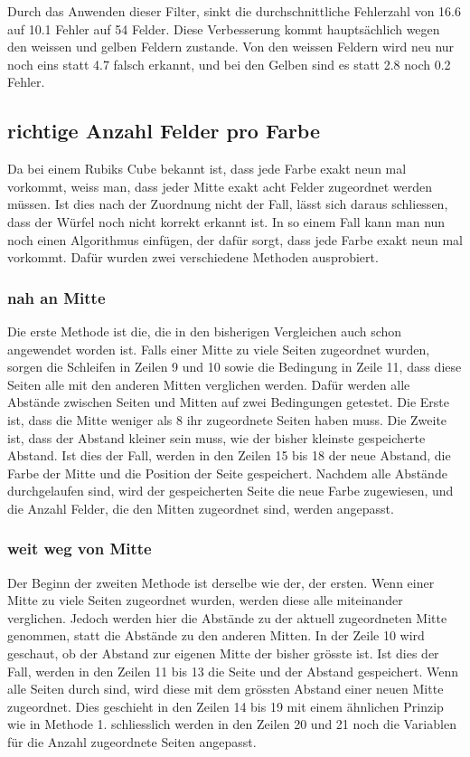 \documentclass[a4paper, 12pt]{article}
\begin{document}
Durch das Anwenden dieser Filter, sinkt die durchschnittliche Fehlerzahl von 16.6 auf 10.1 Fehler auf 54 Felder. Diese Verbesserung kommt hauptsächlich wegen den weissen und gelben Feldern zustande. Von den weissen Feldern wird neu nur noch eins statt 4.7 falsch erkannt, und bei den Gelben sind es statt 2.8 noch 0.2 Fehler.
\subsection{richtige Anzahl Felder pro Farbe}
Da bei einem Rubiks Cube bekannt ist, dass jede Farbe exakt neun mal vorkommt, weiss man, dass jeder Mitte exakt acht Felder zugeordnet werden müssen. Ist dies nach der Zuordnung nicht der Fall, lässt sich daraus schliessen, dass der Würfel noch nicht korrekt erkannt ist. In so einem Fall kann man nun noch einen Algorithmus einfügen, der dafür sorgt, dass jede Farbe exakt neun mal vorkommt. Dafür wurden zwei verschiedene Methoden ausprobiert.
\subsubsection{nah an Mitte}
Die erste Methode ist die, die in den bisherigen Vergleichen auch schon angewendet worden ist. Falls einer Mitte zu viele Seiten zugeordnet wurden, sorgen die Schleifen in Zeilen 9 und 10 sowie die Bedingung in Zeile 11, dass diese Seiten alle mit den anderen Mitten verglichen werden. Dafür werden alle Abstände zwischen Seiten und Mitten auf zwei Bedingungen getestet. Die Erste ist, dass die Mitte weniger als 8 ihr zugeordnete Seiten haben muss. Die Zweite ist, dass der Abstand kleiner sein muss, wie der bisher kleinste gespeicherte Abstand. Ist dies der Fall, werden in den Zeilen 15 bis 18 der neue Abstand, die Farbe der Mitte und die Position der Seite gespeichert. Nachdem alle Abstände durchgelaufen sind, wird der gespeicherten Seite die neue Farbe zugewiesen, und die Anzahl Felder, die den Mitten zugeordnet sind, werden angepasst.

\subsubsection{weit weg von Mitte}
Der Beginn der zweiten Methode ist derselbe wie der, der ersten. Wenn einer Mitte zu viele Seiten zugeordnet wurden, werden  diese alle miteinander verglichen. Jedoch werden hier die Abstände zu der aktuell zugeordneten Mitte genommen, statt die Abstände zu den anderen Mitten. In der Zeile 10 wird geschaut, ob der Abstand zur eigenen Mitte der bisher grösste ist. Ist dies der Fall, werden in den Zeilen 11 bis 13 die Seite und der Abstand gespeichert. Wenn alle Seiten durch sind, wird diese mit dem grössten Abstand einer neuen Mitte zugeordnet. Dies geschieht in den Zeilen 14 bis 19 mit einem ähnlichen Prinzip wie in Methode 1. schliesslich werden in den Zeilen 20 und 21 noch die Variablen für die Anzahl zugeordnete Seiten angepasst.

\end{document}
